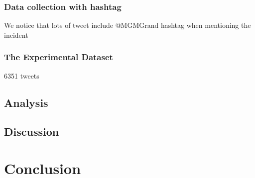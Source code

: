 \subsubsection{Data collection with hashtag}
We notice that lots of tweet include @MGMGrand hashtag when mentioning the incident

\subsubsection{The Experimental Dataset}
6351 tweets

\subsection{Analysis}

\subsection{Discussion}

\section{Conclusion}
